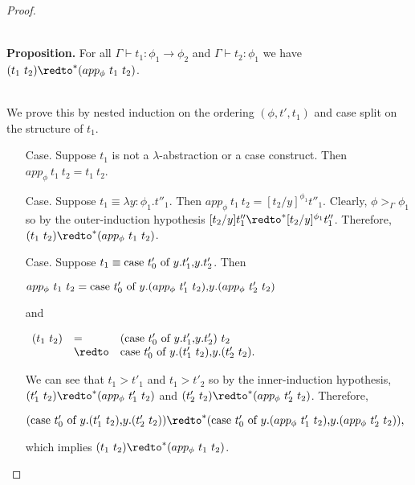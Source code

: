\begin{proof}
\begin{itemize}
    \ \\
    {\bf Proposition.} For all $\Gamma \vdash t_1:\phi_1 \to \phi_2$ and $\Gamma \vdash t_2:\phi_1$ we have
    $(t_1\ t_2) \redto^* (app_\phi\ t_1\ t_2)$.
    
    \ \\
    We prove this by nested induction on the ordering $(\phi, t', t_1)$ and case split on the
    structure of $t_1$.  
    \begin{itemize}
    \item[Case.] Suppose $t_1$ is not a $\lambda$-abstraction or a case construct.  Then 
      $app_\phi\ t_1\ t_2 = t_1\ t_2$.
      
    \item[Case.] Suppose $t_1 \equiv \lambda y:\phi_1.t''_1$.  Then $app_\phi\ t_1\  t_2 = [t_2/y]^{\phi_1} t''_1$.
      Clearly, $\phi >_\Gamma \phi_1$ so by the outer-induction hypothesis 
      $[t_2/y]t''_1 \redto^* [t_2/y]^{\phi_1} t''_1$.  Therefore, $(t_1\ t_2) \redto^* (app_\phi\ t_1\ t_2)$.
      
    \item[Case.] Suppose $t_1 \equiv \mbox{case}\ t'_0\ \text{of}\ y\text{.}t'_1\text{,}y\text{.}t'_2$.  Then 
      \begin{center}
        \begin{math}
          app_\phi\ t_1\ t_2 = \mbox{case}\ t'_0\ \text{of}\ y\text{.}(app_\phi\ t'_1\ t_2)\text{,}y\text{.}(app_\phi\ t'_2\ t_2)
        \end{math}
      \end{center}
      and
      \begin{center}
        \begin{math}
          \begin{array}{lll}
            (t_1\ t_2) & =      & (\ccon{t'_0}{y}{t'_1}{t'_2})\ t_2\\
            & \redto & \ccon{t'_0}{y}{(t'_1\ t_2)}{(t'_2\ t_2)}.
          \end{array}
        \end{math}
      \end{center}
      We can see that $t_1 > t'_1$ and $t_1 > t'_2$ so by the inner-induction hypothesis, $(t'_1\ t_2) \redto^* (app_\phi\ t'_1\ t_2)$ and
      $(t'_2\ t_2) \redto^* (app_\phi\ t'_2\ t_2)$.  Therefore, 
      \begin{center}
        \begin{math}
          (\ccon{t'_0}{y}{(t'_1\ t_2)}{(t'_2\ t_2)}) \redto^* (\ccon{t'_0}{y}{(app_\phi\ t'_1\ t_2)}{(app_\phi\ t'_2\ t_2)}),
        \end{math}
      \end{center}
      which implies $(t_1\ t_2) \redto^* (app_\phi\ t_1\ t_2)$.
    \end{itemize} 
  \end{itemize}
\end{proof}

